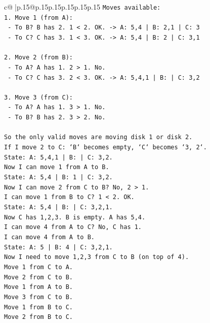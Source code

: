 \documentclass{article}
\begin{document}
{\begin{supertabular}{c@{$\;$}|p{.15\linewidth}@{}p{.15\linewidth}p{.15\linewidth}p{.15\linewidth}p{.15\linewidth}p{.15\linewidth}}
{{{\texttt{Moves available:} \\
\texttt{1. Move 1 (from A):} \\
\texttt{   {-} To B? B has 2. 1 < 2. OK. {-}> A: 5,4 | B: 2,1 | C: 3} \\
\texttt{   {-} To C? C has 3. 1 < 3. OK. {-}> A: 5,4 | B: 2 | C: 3,1} \\
\\ 
\texttt{2. Move 2 (from B):} \\
\texttt{   {-} To A? A has 1. 2 > 1. No.} \\
\texttt{   {-} To C? C has 3. 2 < 3. OK. {-}> A: 5,4,1 | B: | C: 3,2} \\
\\ 
\texttt{3. Move 3 (from C):} \\
\texttt{   {-} To A? A has 1. 3 > 1. No.} \\
\texttt{   {-} To B? B has 2. 3 > 2. No.} \\
\\ 
\texttt{So the only valid moves are moving disk 1 or disk 2.} \\
\texttt{If I move 2 to C: `B` becomes empty, `C` becomes `3, 2`.} \\
\texttt{State: A: 5,4,1 | B: | C: 3,2.} \\
\texttt{Now I can move 1 from A to B.} \\
\texttt{State: A: 5,4 | B: 1 | C: 3,2.} \\
\texttt{Now I can move 2 from C to B? No, 2 > 1.} \\
\texttt{I can move 1 from B to C? 1 < 2. OK.} \\
\texttt{State: A: 5,4 | B: | C: 3,2,1.} \\
\texttt{Now C has 1,2,3. B is empty. A has 5,4.} \\
\texttt{I can move 4 from A to C? No, C has 1.} \\
\texttt{I can move 4 from A to B.} \\
\texttt{State: A: 5 | B: 4 | C: 3,2,1.} \\
\texttt{Now I need to move 1,2,3 from C to B (on top of 4).} \\
\texttt{Move 1 from C to A.} \\
\texttt{Move 2 from C to B.} \\
\texttt{Move 1 from A to B.} \\
\texttt{Move 3 from C to B.} \\
\texttt{Move 1 from B to C.} \\
\texttt{Move 2 from B to C.} \\
}}}
\end{supertabular}}
\end{document}
